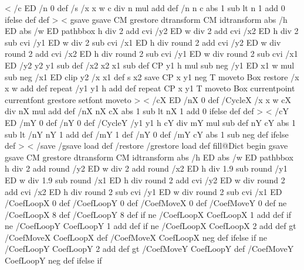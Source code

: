 \ifx\PstTiling\@undefined
  <%
    /c ED
    /n 0 def
    /s {
      /x x w c div n mul add def
      /n n c abs 1 sub lt { n 1 add } { 0 } ifelse def
    } def
  >
<%
  gsave
    gsave \tx@STV CM grestore dtransform CM idtransform
    abs /h ED abs /w ED
    pathbbox
  \ifPSTlualatex
    h div 2 add cvi /y2 ED
    w div 2 add cvi /x2 ED
    h div 2 sub cvi /y1 ED
    w div 2 sub cvi /x1 ED
  \else
    h div round 2 add cvi /y2 ED
    w div round 2 add cvi /x2 ED
    h div round 2 sub cvi /y1 ED
    w div round 2 sub cvi /x1 ED
  \fi
    /y2 y2 y1 sub def
    /x2 x2 x1 sub def
    CP
    y1 h mul sub neg /y1 ED
    x1 w mul sub neg /x1 ED
    clip
    y2 {
      /x x1 def
      s
      x2 {
        save CP x y1
        \ifx\VTeXversion\undefined
        \else
        neg
        \fi
        T moveto Box restore
        /x x w add def
      } repeat
      /y1 y1 h add def
    } repeat
    CP x y1 T moveto Box
  currentpoint currentfont grestore setfont moveto
  >
\else%
  <
    /cX ED
    /nX 0 def
    /CycleX {
      /x x w cX div nX mul add def
      /nX nX cX abs 1 sub lt { nX 1 add } { 0 } ifelse def
    } def 
  >
  <%
    /cY ED
    /mY 0 def
    /nY 0 def
    /CycleY {
      /y1 y1 h cY div mY mul sub def
      nY cY abs 1 sub lt { /nY nY 1 add def /mY 1 def }
                       { /nY 0 def        /mY cY abs 1 sub neg def } ifelse
    } def
  >
  <
    \ifPSTlualatex
      /save /gsave load def
      /restore /grestore load def
      fill@Dict begin
    \fi
    gsave
    gsave \tx@STV CM grestore dtransform CM idtransform
    abs /h ED abs /w ED
    pathbbox 
  \ifPSTlualatex
    h div 2 add round /y2 ED
    w div 2 add round /x2 ED
    h div 1.9 sub round /y1 ED
    w div 1.9 sub round /x1 ED
  \else
    h div round 2 add cvi /y2 ED
    w div round 2 add cvi /x2 ED
    h div round 2 sub cvi /y1 ED
    w div round 2 sub cvi /x1 ED
  \fi
    /CoefLoopX 0 def
    /CoefLoopY 0 def
    /CoefMoveX 0 def
    /CoefMoveY 0 def
    \psk@boxfillangle{} ne {/CoefLoopX 8 def /CoefLoopY 8 def} if
    \psk@fillcyclex{} ne {/CoefLoopX CoefLoopX 1 add def} if
    \psk@fillcycley{} ne {/CoefLoopY CoefLoopY 1 add def} if
    \psk@fillmovex{} ne
      {/CoefLoopX CoefLoopX 2 add def
       \psk@fillmovex{} gt {/CoefMoveX CoefLoopX def}
                           {/CoefMoveX CoefLoopX neg def} ifelse} if
    \psk@fillmovey{} ne
      {/CoefLoopY CoefLoopY 2 add def
       \psk@fillmovey{} gt {/CoefMoveY CoefLoopY def}
                           {/CoefMoveY CoefLoopY neg def} ifelse} if
